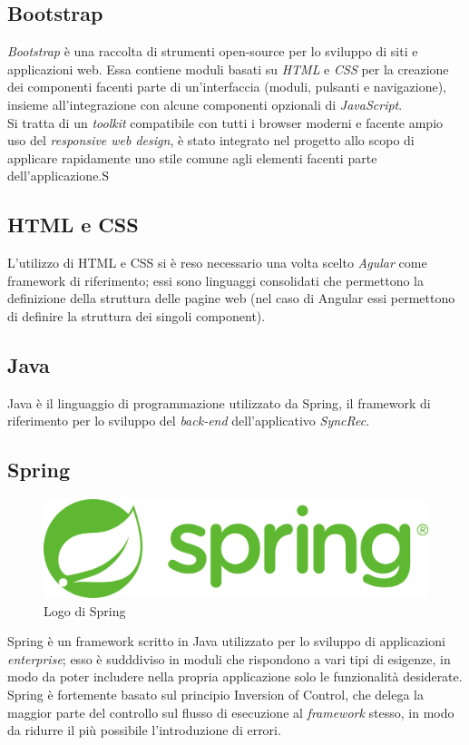 \subsection{Bootstrap}
\textit{Bootstrap} è una raccolta di strumenti \gls{open-source} per lo sviluppo di siti e applicazioni web. Essa contiene moduli basati su \textit{HTML} e \textit{CSS} per la creazione dei componenti facenti parte di un'interfaccia (moduli, pulsanti e navigazione), insieme all'integrazione con alcune componenti opzionali di \textit{JavaScript}.\\
Si tratta di un \textit{toolkit} compatibile con tutti i browser moderni e facente ampio uso del \textit{responsive web design}, è stato integrato nel progetto allo scopo di applicare rapidamente uno stile comune agli elementi facenti parte dell'applicazione.S

\subsection{HTML e CSS}
L'utilizzo di HTML e CSS si è reso necessario una volta scelto \textit{Agular} come \gls{framework} di riferimento; essi sono linguaggi consolidati che permettono la definizione della struttura delle pagine web (nel caso di Angular essi permettono di definire la struttura dei singoli component).

\subsection{Java}
Java è il linguaggio di programmazione utilizzato da \gls{Spring}, il \gls{framework} di riferimento per lo sviluppo del \textit{back-end} dell'applicativo \textit{SyncRec}.

\subsection{Spring}
\begin{figure}[!h] 
	\centering 
	\includegraphics[width=0.4\columnwidth]{immagini/spring.png} 
	\caption{Logo di Spring}
	\label{figura:spring-1}
\end{figure}
\gls{Spring} è un framework scritto in Java utilizzato per lo sviluppo di applicazioni \textit{enterprise}; esso è sudddiviso in moduli che rispondono a vari tipi di esigenze, in modo da poter includere nella propria applicazione solo le funzionalità desiderate.\\
\gls{Spring} è fortemente basato sul principio \gls{Inversion of Control}, che delega la maggior parte del controllo sul flusso di esecuzione al \textit{framework} stesso, in modo da ridurre il più possibile l'introduzione di errori.

